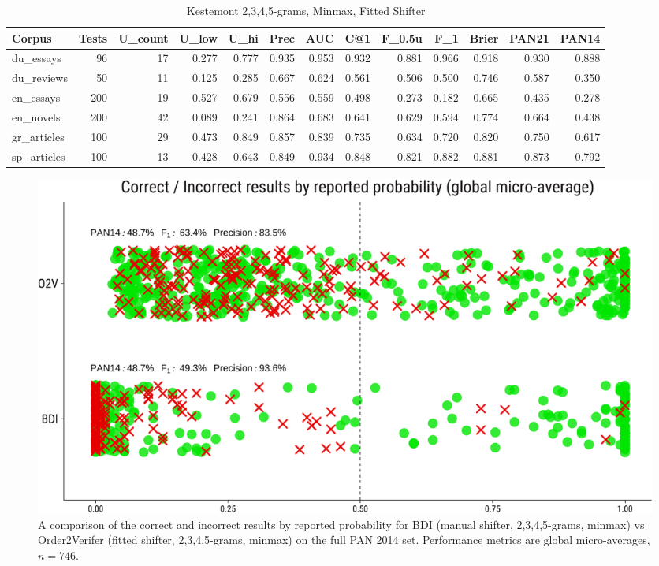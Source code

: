 \documentclass[
    hf
]{ceurart}
\begin{document}
\begin{table}
    \caption{Kestemont 2,3,4,5-grams, Minmax, Fitted Shifter}
    \label{tab:o2v}
    \raggedright
    \begin{adjustbox}{max width=\textwidth}

        \begin{tabular}{lrrrrrrrrrrrr}
            \toprule
            Corpus       & Tests & U_{count} & U_{low} & U_{hi} & Prec  & AUC   & C@1   & F_{0.5u} & F_1   & Brier & PAN21 & PAN14 \\
            \midrule
            du\_essays   & 96    & 17        & 0.277   & 0.777  & 0.935 & 0.953 & 0.932 & 0.881   & 0.966 & 0.918 & 0.930 & 0.888 \\
            du\_reviews  & 50    & 11        & 0.125   & 0.285  & 0.667 & 0.624 & 0.561 & 0.506   & 0.500 & 0.746 & 0.587 & 0.350 \\
            en\_essays   & 200   & 19        & 0.527   & 0.679  & 0.556 & 0.559 & 0.498 & 0.273   & 0.182 & 0.665 & 0.435 & 0.278 \\
            en\_novels   & 200   & 42        & 0.089   & 0.241  & 0.864 & 0.683 & 0.641 & 0.629   & 0.594 & 0.774 & 0.664 & 0.438 \\
            gr\_articles & 100   & 29        & 0.473   & 0.849  & 0.857 & 0.839 & 0.735 & 0.634   & 0.720 & 0.820 & 0.750 & 0.617 \\
            sp\_articles & 100   & 13        & 0.428   & 0.643  & 0.849 & 0.934 & 0.848 & 0.821   & 0.882 & 0.881 & 0.873 & 0.792 \\
            \bottomrule
        \end{tabular}
    \end{adjustbox}
\end{table}

\begin{figure}
    \includegraphics[width=\linewidth]{figures/bdi_o2v-crop.pdf}
    \caption{A comparison of the correct and incorrect results by reported probability for BDI
        (manual shifter, 2,3,4,5-grams, minmax) vs Order2Verifer (fitted shifter, 2,3,4,5-grams,
        minmax) on the full PAN 2014 set. Performance metrics are global micro-averages, $n=746$.}
    \label{fig:bdi_o2v}
\end{figure}
\end{document}
